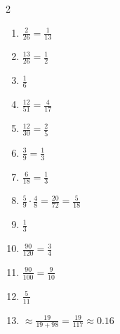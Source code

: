 \documentclass[11pt]{article}
\begin{document}
\begin{keybox}
\begin{multicols}{2}
\small
\begin{enumerate}[leftmargin=*,itemsep=3pt]
  \item $\tfrac{2}{26}=\tfrac{1}{13}$
  \item $\tfrac{13}{26}=\tfrac12$
  \item $\tfrac16$
  \item $\tfrac{12}{51}=\tfrac{4}{17}$
  \item $\tfrac{12}{30}=\tfrac25$
  \item $\tfrac39=\tfrac13$
  \item $\tfrac{6}{18}=\tfrac13$
  \item $\tfrac59\cdot\tfrac48=\tfrac{20}{72}=\tfrac{5}{18}$
  \item $\tfrac13$
  \item $\tfrac{90}{120}=\tfrac34$
  \item $\tfrac{90}{100}=\tfrac{9}{10}$
  \item $\tfrac{5}{11}$
  \item $\approx\tfrac{19}{19+98}=\tfrac{19}{117}\approx0.16$
\end{enumerate}
\end{multicols}
\end{keybox}
\end{document}
